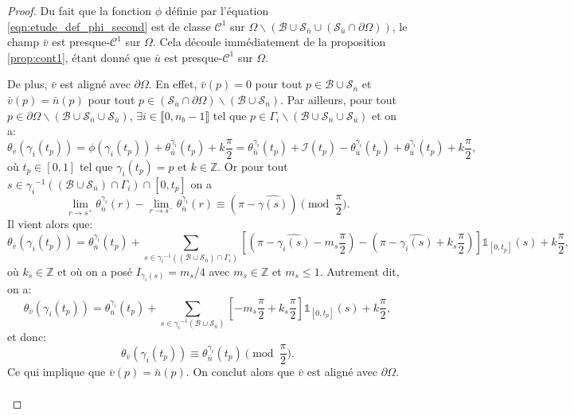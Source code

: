\begin{proof}
    Du fait que la fonction $\phi$ définie par l'équation \eqref{eqn:etude_def_phi_second} est de classe $\mathcal{C}^1$ sur $\Omega\backslash(\mathcal{B}\cup\mathcal{S}_{\bar{n}}\cup(\mathcal{S}_{\bar{u}}\cap\partial\Omega))$, le champ $\bar{v}$ est presque-$\mathcal{C}^1$ sur $\Omega$. Cela découle immédiatement de la proposition \ref{prop:cont1}, étant donné que $\bar{u}$ est presque-$\mathcal{C}^1$ sur $\Omega$.

    De plus, $\bar{v}$ est aligné avec $\partial\Omega$. En effet, $\bar{v}(p)=0$ pour tout $p\in\mathcal{B}\cup\mathcal{S}_{\bar{n}}$ et $\bar{v}(p)=\bar{n}(p)$ pour tout $p\in(\mathcal{S}_{\bar{u}}\cap\partial\Omega)\backslash(\mathcal{B}\cup\mathcal{S}_{\bar{n}})$. Par ailleurs, pour tout $p\in\partial\Omega\backslash(\mathcal{B}\cup\mathcal{S}_{\bar{n}}\cup\mathcal{S}_{\bar{u}})$, $\exists i\in\llbracket0, n_b-1\rrbracket$ tel que $p\in\Gamma_i\backslash(\mathcal{B}\cup\mathcal{S}_{\bar{n}}\cup\mathcal{S}_{\bar{u}})$ et on a:
    $$\theta_{\bar{v}}(\gamma_i(t_p))=\phi(\gamma_i(t_p))+\theta_{\bar{u}}^{\gamma_i}(t_p)+k\frac{\pi}{2}=\theta_{\bar{n}}^{\gamma_i}(t_p)+\mathcal{I}(t_p)-\theta_{\bar{u}}^{\gamma_i}(t_p)+\theta_{\bar{u}}^{\gamma_i}(t_p)+k\frac{\pi}{2},$$
    où $t_p\in[0,1]$ tel que $\gamma_i(t_p)=p$ et $k\in\mathbb{Z}$. Or pour tout $s\in{\gamma_i}^{-1}((\mathcal{B}\cup\mathcal{S}_{\bar{n}})\cap\Gamma_i)\cap[0, t_p]$ on a
    $$
    \lim_{r\rightarrow s^+}\theta^{\gamma_i}_{\bar{n}}(r) - \lim_{r\rightarrow s^-}\theta^{\gamma_i}_{\bar{n}}(r)\equiv(\pi-\widehat{\gamma(s)})\pmod{\frac{\pi}{2}}.
    $$
    Il vient alors que:
    $$
    \theta_{\bar{v}}(\gamma_i(t_p))=\theta_{\bar{n}}^{\gamma_i}(t_p)+\displaystyle\sum_{s\in{\gamma_i}^{-1}((\mathcal{B}\cup\mathcal{S}_{\bar{n}})\cap\Gamma_i)}\left[\left(\pi-\widehat{\gamma_i(s)}-m_s\frac{\pi}{2}\right)-\left(\pi-\widehat{\gamma_i(s)}+k_s\frac{\pi}{2}\right)\right]\mathbb{1}_{[0, t_p]}(s)+k\frac{\pi}{2},
    $$
    où $k_s\in\mathbb{Z}$ et où on a posé $I_{\gamma_i(s)}=m_s/4$ avec $m_s\in\mathbb{Z}$ et $m_s\leq1$. Autrement dit, on a:
    $$
    \theta_{\bar{v}}(\gamma_i(t_p))=\theta_{\bar{n}}^{\gamma_i}(t_p)+\displaystyle\sum_{s\in{\gamma_i}^{-1}(\mathcal{B}\cup\mathcal{S}_{\bar{n}})}\left[-m_s\frac{\pi}{2}+k_s\frac{\pi}{2}\right]\mathbb{1}_{[0, t_p]}(s)+k\frac{\pi}{2},$$
    et donc:
    $$
    \theta_{\bar{v}}(\gamma_i(t_p))\equiv\theta_{\bar{n}}^{\gamma_i}(t_p)\pmod{\frac{\pi}{2}}.
    $$
    Ce qui implique que $\bar{v}(p)=\bar{n}(p)$. On conclut alors que $\bar{v}$ est aligné avec $\partial\Omega$.\\\\

\end{proof}
